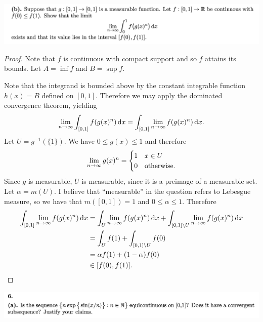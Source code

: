 \begin{mdframed}
  \includegraphics[width=400pt]{img/analysis--berkeley-202a-final-cd70.png}
\end{mdframed}

\begin{proof}

  Note that $f$ is continuous with compact support and so $f$ attains its bounds. Let $A = \inf f$
  and $B = \sup f$.

  Note that the integrand is bounded above by the constant integrable function $h(x) = B$ defined on $[0, 1]$.
  Therefore we may apply the dominated convergence theorem, yielding
  \begin{align*}
    \limninf \int_{[0, 1]} f(g(x)^n) \dx = \int_{[0, 1]} \limninf  f(g(x)^n) \dx.
  \end{align*}
  Let $U = g^{-1}(\{1\})$. We have $0 \leq g(x) \leq 1$ and therefore
  \begin{align*}
    \limninf g(x)^n =
    \begin{cases}
      1 & x \in U \\
      0 & \text{otherwise}.
    \end{cases}
  \end{align*}
  Since $g$ is measurable, $U$ is measurable, since it is a preimage of a measurable set. Let $\alpha = m(U)$.
  I believe that ``measurable​'' in the question refers to Lebesgue measure, so we have that $m([0, 1]) = 1$
  and $0 \leq \alpha \leq 1$. Therefore
  \begin{align*}
    \int_{[0, 1]} \limninf  f(g(x)^n) \dx
    &= \int_U \limninf  f(g(x)^n) \dx + \int_{[0, 1] \setminus U} \limninf  f(g(x)^n) \dx \\
    &= \int_U f(1) + \int_{[0, 1] \setminus U} f(0) \\
    &= \alpha f(1) + (1 - \alpha) f(0) \\
    &\in [f(0), f(1)].
  \end{align*}
\end{proof}


\newpage
\begin{mdframed}
  \includegraphics[width=400pt]{img/analysis--berkeley-202a-final-f5b6.png}
\end{mdframed}

